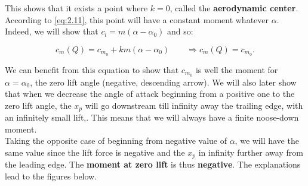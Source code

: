 			This shows that it exists a point where $k = 0$, called the \textbf{aerodynamic center}. According to \eqref{eq:2.11}, this point will have a constant moment whatever $\alpha$. Indeed, we will show that $c_l = m(\alpha - \alpha _0)$ and so:
			
			\begin{equation}
			c_m(Q) = c_{m_0} + k m(\alpha - \alpha _0) \qquad \Rightarrow c_m(Q) = c_{m_0}.
			\end{equation}			 
			
			We can benefit from this equation to show that $c_{m_0}$ is well the moment for $\alpha = \alpha _0$, the zero lift angle (negative, descending arrow). We will also later show that when we decrease the angle of attack beginning from a positive one to the zero lift angle, the $x_p$ will go downstream till infinity away the trailing edge, with an infinitely small lift,. This means that we will always have a finite noose-down moment. \\
			
			Taking the opposite case of beginning from negative value of $\alpha$, we will have the same value since the lift force is negative and the $x_p$ in infinity further away from the leading edge. The \textbf{moment at zero lift} is thus \textbf{negative}. The explanations lead to the figures below.
			
